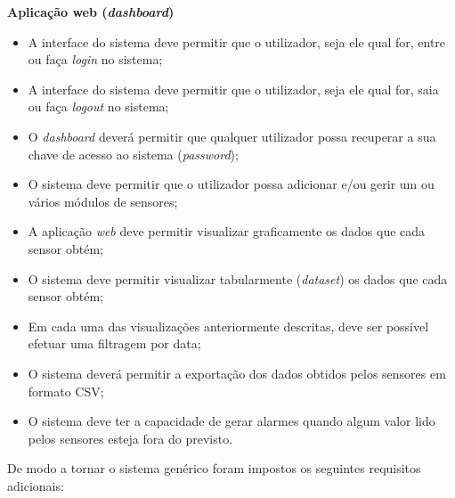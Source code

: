 \textbf{Aplicação web (\textit{dashboard})}


\begin{itemize}
	\item A interface do sistema deve permitir que o utilizador, seja ele qual for, entre ou faça \textit{login} no sistema;
	
	\item A interface do sistema deve permitir que o utilizador, seja ele qual for, saia ou faça \textit{logout} no sistema;
	
	\item O \textit{dashboard} deverá permitir que qualquer utilizador possa recuperar a sua chave de acesso ao sistema (\textit{password});
	
	\item O sistema deve permitir que o utilizador possa adicionar e/ou gerir um ou vários módulos de sensores; 
	
	\item A aplicação \textit{web} deve permitir visualizar graficamente os dados que cada sensor obtém; 
	
	\item O sistema deve permitir visualizar tabularmente (\textit{dataset}) os dados que cada sensor obtém;  
	
	\item Em cada uma das visualizações anteriormente descritas, deve ser possível efetuar uma filtragem por data;
	
	\item O sistema deverá permitir a exportação dos dados obtidos pelos sensores  em formato \ac{CSV}; 
	
	\item O sistema deve ter a capacidade de gerar alarmes quando algum valor lido pelos sensores esteja fora do previsto.
	
\end{itemize}


De modo a tornar o sistema genérico foram impostos os seguintes requisitos adicionais: 


